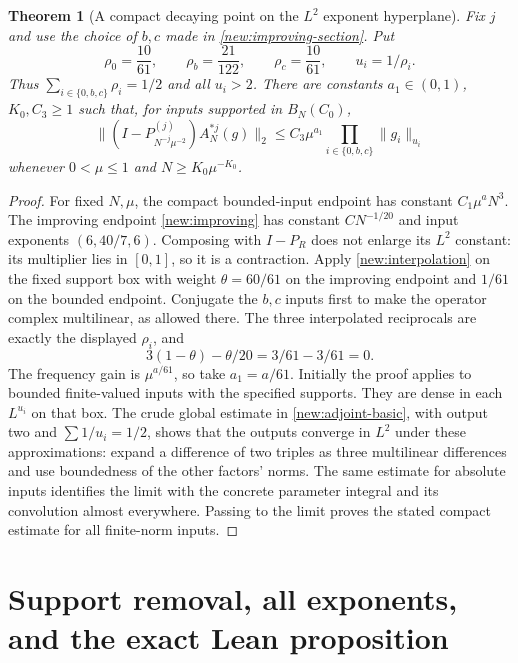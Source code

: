 \documentclass[11pt]{article}
\newtheorem{theorem}{Theorem}[section]
\theoremstyle{definition}
\begin{document}
\begin{theorem}[A compact decaying point on the $L^2$ exponent hyperplane]
\label{new:compact-decaying-point}
Fix $j$ and use the choice of $b,c$ made in \cref{new:improving-section}. Put
\[
 \rho_0=\frac{10}{61},\qquad\rho_b=\frac{21}{122},\qquad
 \rho_c=\frac{10}{61},\qquad u_i=1/\rho_i.
\]
Thus $\sum_{i\in\{0,b,c\}}\rho_i=1/2$ and all $u_i>2$. There are constants
$a_1\in(0,1)$, $K_0,C_3\geq1$ such that, for inputs supported in $B_N(C_0)$,
\[
 \|(I-P_{N^{-j}\mu^{-2}}^{(j)})A_N^{*j}(g)\|_2
 \leq C_3\mu^{a_1}\prod_{i\in\{0,b,c\}}\|g_i\|_{u_i}
\]
whenever $0<\mu\leq1$ and $N\geq K_0\mu^{-K_0}$.
\end{theorem}
\begin{proof}
For fixed $N,\mu$, the compact bounded-input endpoint has constant $C_1\mu^a N^3$.
The improving endpoint \cref{new:improving} has constant $CN^{-1/20}$ and input exponents
$(6,40/7,6)$. Composing with $I-P_R$ does not enlarge its $L^2$ constant: its multiplier
lies in $[0,1]$, so it is a contraction. Apply \cref{new:interpolation} on the fixed support
box with weight $\theta=60/61$ on the improving endpoint and $1/61$ on the bounded endpoint.
Conjugate the $b,c$ inputs first to make the operator complex multilinear, as allowed there.
The three interpolated reciprocals are exactly the displayed $\rho_i$, and
\[
 3(1-\theta)-\theta/20=3/61-3/61=0.
\]
The frequency gain is $\mu^{a/61}$, so take $a_1=a/61$. Initially the proof applies to
bounded finite-valued inputs with the specified supports. They are dense in each $L^{u_i}$
on that box. The crude global estimate in \cref{new:adjoint-basic}, with output two and
$\sum1/u_i=1/2$, shows that the outputs converge in $L^2$ under these approximations:
expand a difference of two triples as three multilinear differences and use boundedness of
the other factors' norms. The same estimate for absolute inputs identifies the limit with
the concrete parameter integral and its convolution almost everywhere. Passing to the limit
proves the stated compact estimate for all finite-norm inputs.
\end{proof}

\section{Support removal, all exponents, and the exact Lean proposition}
\label{new:global-section}
\end{document}
